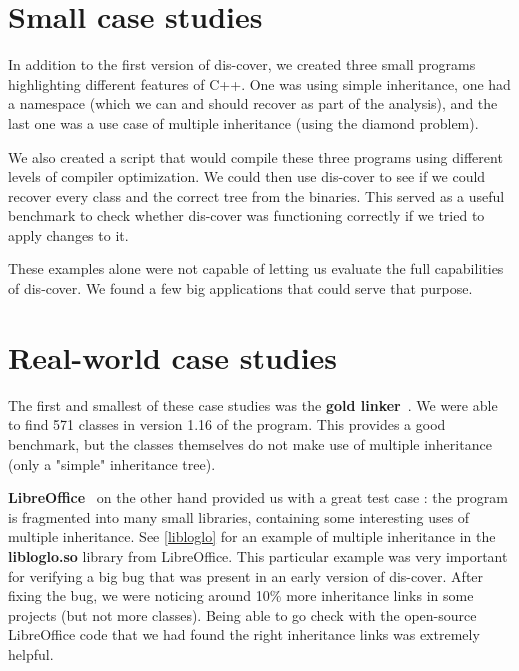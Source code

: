 \documentclass[a4paper,11pt,oneside]{report}
\begin{document}

\section{Small case studies}

In addition to the first version of dis-cover, we created three small programs 
highlighting different features of C++.
One was using simple inheritance,
one had a namespace (which we can and should recover as part of the analysis),
and the last one was a use case of multiple inheritance (using the diamond 
problem).

We also created a script that would compile these three programs using
different levels of compiler optimization.
We could then use dis-cover to see if we could recover every class and the 
correct tree from the binaries.
This served as a useful benchmark to check whether dis-cover was functioning 
correctly if we tried to apply changes to it.

These examples alone were not capable of letting us evaluate the full 
capabilities of dis-cover.
We found a few big applications that could serve that purpose.

\section{Real-world case studies}

The first and smallest of these case studies was the \textbf{gold 
linker}~\cite{gold}.
We were able to find 571 classes in version 1.16 of the program.
This provides a good benchmark, but the classes themselves do not make use of 
multiple inheritance (only a "simple" inheritance tree).

\textbf{LibreOffice}~\cite{libreoffice} on the other hand provided us with a 
great test case :
the program is fragmented into many small libraries, containing some 
interesting uses of multiple inheritance.
See \autoref{libloglo} for an example of multiple inheritance in the 
\textbf{libloglo.so} library from LibreOffice.
This particular example was very important for verifying a big bug that was 
present in an early version of dis-cover.
After fixing the bug, we were noticing around 10\% more inheritance links in 
some projects (but not more classes).
Being able to go check with the open-source LibreOffice code that we had found 
the right inheritance links was extremely helpful.
\end{document}
